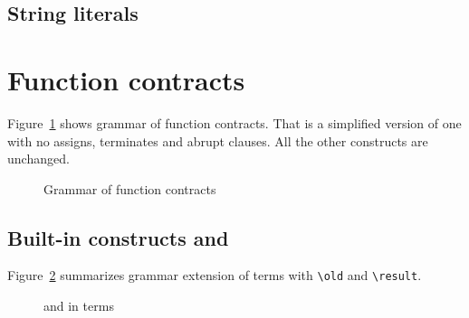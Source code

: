
\subsection{String literals}
\nodiff


\section{Function contracts}
\label{sec:fn-behavior}


Figure~\ref{fig:gram:contracts} shows grammar of function contracts. That is a
simplified version of \acsl one with no assigns, terminates and abrupt
clauses. All the other constructs are unchanged.
\begin{figure}[htbp]
  \begin{cadre}
      
   \end{cadre}
    \caption{Grammar of function contracts}
  \label{fig:gram:contracts}
\end{figure}


\subsection{Built-in constructs %
  \texorpdfstring{\old}{\textbackslash{}old} %
 and \texorpdfstring{\result}{\textbackslash{}result}}

\nodiff

Figure~\ref{fig:gram:oldandresult} summarizes grammar extension of terms with
\lstinline|\old| and \lstinline|\result|.
\begin{figure}[htbp]
  \begin{cadre}
      
    \end{cadre}
    \caption{\protect\old and \protect\result in terms}
  \label{fig:gram:oldandresult}
\end{figure}


